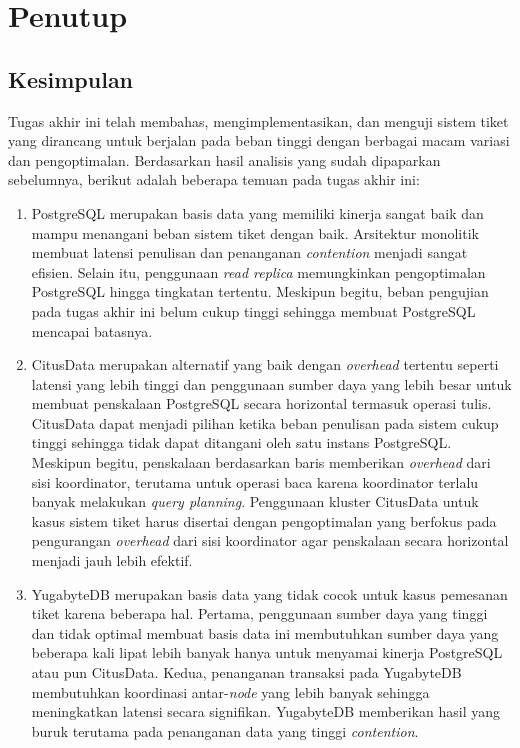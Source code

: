 \chapter{Penutup}

\section{Kesimpulan}

Tugas akhir ini telah membahas, mengimplementasikan, dan menguji sistem tiket yang dirancang untuk berjalan pada beban tinggi dengan berbagai macam variasi dan pengoptimalan. Berdasarkan hasil analisis yang sudah dipaparkan sebelumnya, berikut adalah beberapa temuan pada tugas akhir ini:

\begin{enumerate}
    \item PostgreSQL merupakan basis data yang memiliki kinerja sangat baik dan mampu menangani beban sistem tiket dengan baik. Arsitektur monolitik membuat latensi penulisan dan penanganan \textit{contention} menjadi sangat efisien. Selain itu, penggunaan \textit{read replica} memungkinkan pengoptimalan PostgreSQL hingga tingkatan tertentu. Meskipun begitu, beban pengujian pada tugas akhir ini belum cukup tinggi sehingga membuat PostgreSQL mencapai batasnya.
    \item CitusData merupakan alternatif yang baik dengan \textit{overhead} tertentu seperti latensi yang lebih tinggi dan penggunaan sumber daya yang lebih besar untuk membuat penskalaan PostgreSQL secara horizontal termasuk operasi tulis. CitusData dapat menjadi pilihan ketika beban penulisan pada sistem cukup tinggi sehingga tidak dapat ditangani oleh satu instans PostgreSQL. Meskipun begitu, penskalaan berdasarkan baris memberikan \textit{overhead} dari sisi koordinator, terutama untuk operasi baca karena koordinator terlalu banyak melakukan \textit{query planning}. Penggunaan kluster CitusData untuk kasus sistem tiket harus disertai dengan pengoptimalan yang berfokus pada pengurangan \textit{overhead} dari sisi koordinator agar penskalaan secara horizontal menjadi jauh lebih efektif.
    \item YugabyteDB merupakan basis data yang tidak cocok untuk kasus pemesanan tiket karena beberapa hal. Pertama, penggunaan sumber daya yang tinggi dan tidak optimal membuat basis data ini membutuhkan sumber daya yang beberapa kali lipat lebih banyak hanya untuk menyamai kinerja PostgreSQL atau pun CitusData. Kedua, penanganan transaksi pada YugabyteDB membutuhkan koordinasi antar-\textit{node} yang lebih banyak sehingga meningkatkan latensi secara signifikan. YugabyteDB memberikan hasil yang buruk terutama pada penanganan data yang tinggi \textit{contention}.

\end{enumerate}
